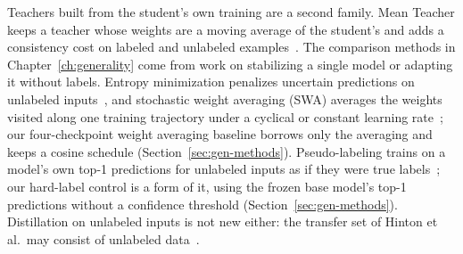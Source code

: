 Teachers built from the student's own training are a second family.
Mean Teacher keeps a teacher whose weights are a moving average of the
student's and adds a consistency cost on labeled and unlabeled
examples~\cite{tarvainen2017mean}.
The comparison methods in Chapter~\ref{ch:generality} come from work
on stabilizing a single model or adapting it without labels. Entropy
minimization penalizes uncertain predictions on unlabeled
inputs~\cite{grandvalet2004semi}, and stochastic weight averaging (SWA)
averages the weights visited along one training trajectory under a
cyclical or constant learning rate~\cite{izmailov2018averaging}; our
four-checkpoint weight averaging baseline borrows only the averaging
and keeps a cosine schedule (Section~\ref{sec:gen-methods}).
Pseudo-labeling trains on a
model's own top-1 predictions for unlabeled inputs as if they were
true labels~\cite{lee2013pseudo}; our hard-label control is a form of it,
using the frozen base model's top-1 predictions without a confidence
threshold (Section~\ref{sec:gen-methods}).
Distillation on unlabeled
inputs is not new either: the transfer set of Hinton et al.\ may
consist of unlabeled data~\cite{hinton2015distilling}.

